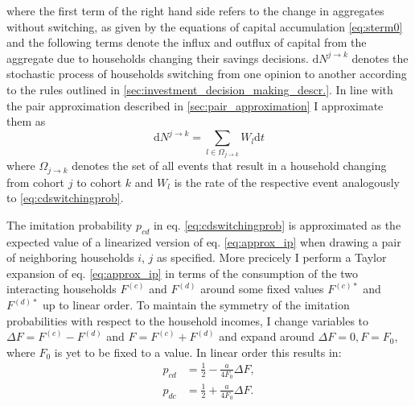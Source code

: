 where the first term of the right hand side refers to the change in aggregates without switching, as given by the equations of capital accumulation \eqref{eq:sterm0} and the following terms denote the influx and outflux of capital from the aggregate due to households changing their savings decisions.
$\mathrm{ d} N^{j \rightarrow k}$ denotes the stochastic process of households switching from one opinion to another according to the rules outlined in \ref{sec:investment_decision_making_descr.}. In line with the pair approximation described in \ref{sec:pair_approximation} I approximate them as
\begin{equation}
\mathrm{ d} N^{j \rightarrow k} = \sum_{l \in \Omega_{j \rightarrow k}}W_l \mathrm{ d}t
\end{equation}
where $\Omega_{j \rightarrow k}$ denotes the set of all events that result in a household changing from cohort $j$ to cohort $k$ and $W_l$ is the rate of the respective event analogously to \eqref{eq:cdswitchingprob}.

The imitation probability $p_{cd}$ in eq. \eqref{eq:cdswitchingprob} is approximated as the expected value of a linearized version of eq. \eqref{eq:approx_ip} when drawing a pair of neighboring households $i$, $j$ as specified. More precicely I perform a Taylor expansion of eq. \ref{eq:approx_ip} in terms of the consumption of the two interacting households $F^{(c)}$ and $F^{(d)}$ around some fixed values $F^{(c)*}$ and $F^{(d)*}$ up to linear order. To maintain the symmetry of the imitation probabilities with respect to the household incomes, I change variables to $\Delta F = F^{(c)} - F^{(d)}$ and $F = F^{(c)} + F^{(d)}$ and expand around $\Delta F = 0, F = F_0$, where $F_0$ is yet to be fixed to a value. In linear order this results in:
\begin{align}
	p_{cd} &= \frac{1}{2} - \frac{a}{4 F_0} \Delta F, \label{eq:approx_p_cd}\\
	p_{dc} &= \frac{1}{2} + \frac{a}{4 F_0} \Delta F. \label{eq:approx_p_dc}
\end{align}

